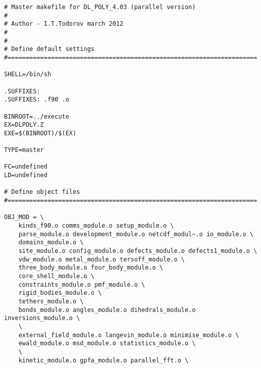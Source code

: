 \begin{verbatim}
# Master makefile for DL_POLY_4.03 (parallel version)
#
# Author - I.T.Todorov march 2012
#
#
# Define default settings
#=====================================================================

SHELL=/bin/sh

.SUFFIXES:
.SUFFIXES: .f90 .o

BINROOT=../execute
EX=DLPOLY.Z
EXE=$(BINROOT)/$(EX)

TYPE=master

FC=undefined
LD=undefined

# Define object files
#=====================================================================

OBJ_MOD = \
	kinds_f90.o comms_module.o setup_module.o \
	parse_module.o development_module.o netcdf_modul~.o io_module.o \
	domains_module.o \
	site_module.o config_module.o defects_module.o defects1_module.o \
	vdw_module.o metal_module.o tersoff_module.o \
	three_body_module.o four_body_module.o \
	core_shell_module.o \
	constraints_module.o pmf_module.o \
	rigid_bodies_module.o \
	tethers_module.o \
	bonds_module.o angles_module.o dihedrals_module.o inversions_module.o \
	\
	external_field_module.o langevin_module.o minimise_module.o \
	ewald_module.o msd_module.o statistics_module.o \
	\
	kinetic_module.o gpfa_module.o parallel_fft.o \


\end{verbatim}
